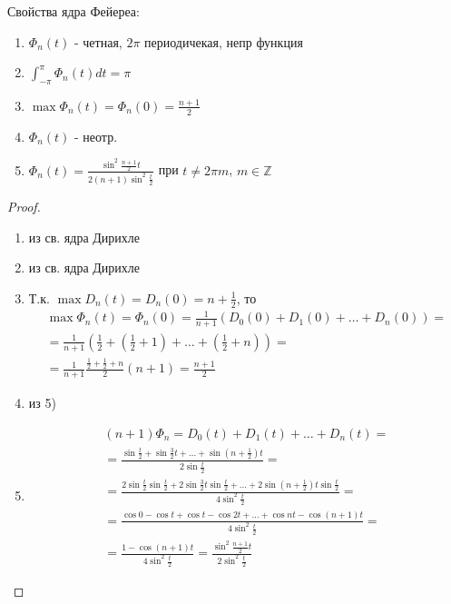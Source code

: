 \documentclass{article}
\begin{document}
Свойства ядра Фейереа:
\begin{enumerate}
  \item $\Phi_n(t)$ - четная, $2\pi$ периодичекая, непр функция
  \item $\int_{-\pi}^{\pi}\Phi_n(t)dt=\pi$
  \item $\max \Phi_n(t)=\Phi_n(0)=\frac{n+1}{2}$
  \item $\Phi_n(t)$ - неотр.
  \item $\Phi_n(t)=\frac{\sin^{2}\frac{n+1}{2}t}{2(n+1)\sin^{2}\frac{t}{2}}$
    при $t\neq 2\pi m$, $m\in \mathbb{Z}$
\end{enumerate}
\begin{proof}
  \begin{enumerate}
    \item из св. ядра Дирихле
    \item из св. ядра Дирихле
    \item Т.к. $\max D_n(t)=D_n(0)=n+\frac{1}{2}$, то
      \begin{gather*}
        \max \Phi_n(t)=\Phi_n(0)=\frac{1}{n+1}(D_0(0)+D_1(0)+\dots +D_n(0))= \\
        =\frac{1}{n+1}\left(\frac{1}{2}+\left(\frac{1}{2}+1\right)+\dots +\left(\frac{1}{2}+n\right)\right)= \\
        =\frac{1}{n+1}\frac{\frac{1}{2}+\frac{1}{2}+n}{2}(n+1)=\frac{n+1}{2}
      \end{gather*}
    \item из 5)
    \item
      \begin{gather*}
        (n+1)\Phi_n=D_0(t)+D_1(t)+\dots +D_n(t)=\\
        =\frac{\sin \frac{t}{2}+\sin \frac{3}{2}t + \dots +\sin(n+\frac{1}{2})t}{2\sin \frac{t}{2}} = \\
        =\frac{2\sin \frac{t}{2} \sin \frac{t}{2}+2\sin\frac{3}{2}t\sin\frac{t}{2}+\dots +2\sin(n+\frac{1}{2})t\sin\frac{t}{2}}{4\sin^{2}\frac{t}{2}} = \\
        =\frac{\cos 0 - \cos t + \cos t - \cos 2t +\dots + \cos nt - \cos (n+1)t}{4\sin^{2}\frac{t}{2}} = \\ 
        =\frac{1-\cos (n+1)t}{4\sin^{2}\frac{t}{2}}=\frac{\sin^{2}\frac{n+1}{2}t}{2\sin^{2}\frac{t}{2}}
      \end{gather*}
  \end{enumerate}
\end{proof}
\end{document}
